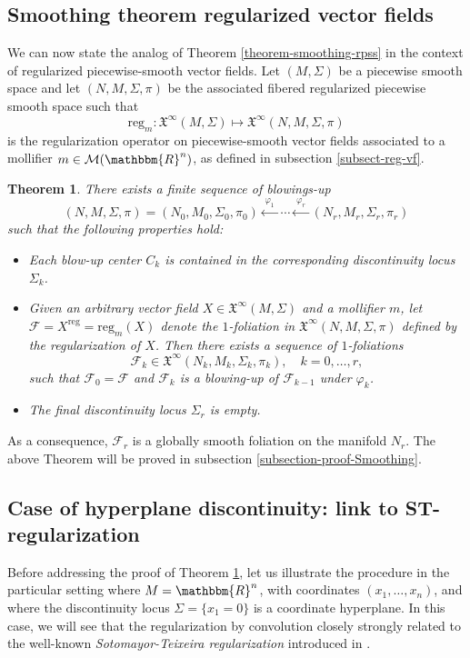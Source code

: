 \documentclass[11pt,psamsfonts]{article}
\newtheorem{Theorem}{Theorem}[section]
\theoremstyle{definition}
\theoremstyle{remark}
\newcommand{\cR}{\ensuremath{\mathbbm{R}}}
\newcommand{\Mol}{\mathcal{M}}
\newcommand{\vF}{\mathcal{F}}
\newcommand{\reg}{\mathrm{reg}}
\begin{document}
\subsection{Smoothing theorem regularized vector fields}\label{subsect-smoothing-vf}
We can now state the analog of Theorem \ref{theorem-smoothing-rpss} in the context of regularized piecewise-smooth vector fields. Let $(M,\Sigma)$ be a piecewise smooth space and let $(N,M,\Sigma,\pi)$ be the associated fibered regularized piecewise smooth space such that 
$$
\reg_m: \mathfrak{X}^{\infty} (M, \Sigma) \longmapsto \mathfrak{X}^{\infty} (N, M,\Sigma,\pi)
$$
is the regularization operator on piecewise-smooth vector fields associated to a mollifier $m\in\Mol(\cR^n)$, as defined in  subsection \ref{subsect-reg-vf}.
\begin{Theorem}\label{theorem-smoothing-regvf}
There exists a finite sequence of blowings-up
\[
(N, M, \Sigma, \pi) = (N_0, M_0, \Sigma_0, \pi_0)
\xleftarrow{\;\varphi_1\;}
\cdots
\xleftarrow{\;\varphi_r\;}
(N_r, M_r, \Sigma_r, \pi_r)
\]
such that the following properties hold:
\begin{itemize}
  \item Each blow-up center \(C_k\) is contained in the corresponding discontinuity locus \(\Sigma_k\).
  
  \item Given an arbitrary vector field \(X \in \mathfrak{X}^{\infty}(M, \Sigma)\) and a mollifier \(m\), let \(\vF = X^{\mathrm{reg}} = \mathrm{reg}_m(X)\) denote the $1$-foliation in \(\mathfrak{X}^{\infty}(N, M, \Sigma, \pi)\) defined by the regularization of \(X\). Then there exists a sequence of $1$-foliations
  \begin{equation}\label{severalvFk}
  \vF_k \in \mathfrak{X}^{\infty}(N_k, M_k, \Sigma_k, \pi_k), \quad k = 0, \ldots, r,
  \end{equation}
  such that \(\vF_0 = \vF\) and \(\vF_{k}\) is a blowing-up of \(\vF_{k-1}\) under \(\varphi_k\).
  
  \item The final discontinuity locus \(\Sigma_r\) is empty.
\end{itemize}
\end{Theorem}
As a consequence, $\vF_r$ is a globally smooth foliation on the manifold $N_r$.   The above Theorem will be proved in subsection \ref{subsection-proof-Smoothing}.
\subsection{Case of hyperplane discontinuity: link to ST-regularization}\label{subsection-st-reg-link}
Before addressing the proof of Theorem \ref{theorem-smoothing-regvf}, let us illustrate the procedure in the particular setting where $M = \cR^n$, with coordinates $(x_1,\ldots,x_n)$, and where the discontinuity locus $\Sigma = \{x_1 = 0\}$ is a coordinate hyperplane.  In this case, we will see that the regularization by convolution closely strongly related to the well-known {\em Sotomayor-Teixeira regularization} introduced in \cite{ST}. 
\end{document}
